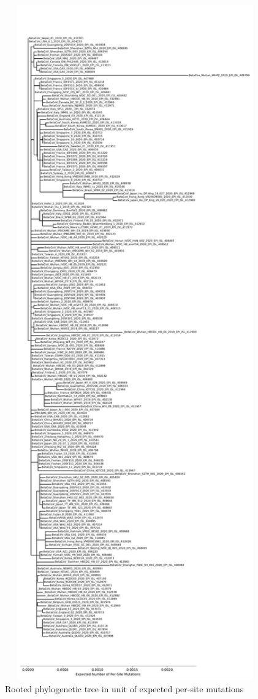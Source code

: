 \documentclass{article}
\begin{document}
\begin{figure}[h]
\centering
\includegraphics[width=1\textwidth]{./figs/tree_mutations.pdf}
\caption{Rooted phylogenetic tree in unit of expected per-site mutations}
\end{figure}
\end{document}
